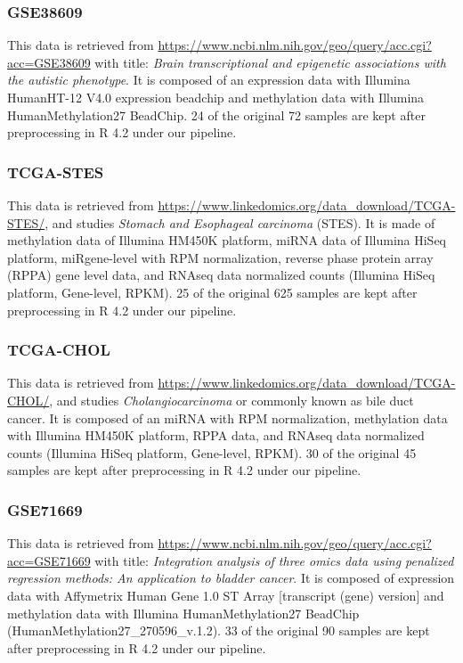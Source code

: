 \documentclass[
]{article}
\begin{document}
\hypertarget{gse38609}{%
\subsubsection{GSE38609}\label{gse38609}}

This data is retrieved from \url{https://www.ncbi.nlm.nih.gov/geo/query/acc.cgi?acc=GSE38609} with title: \emph{Brain transcriptional and epigenetic associations with the autistic phenotype}. It is composed of an expression data with Illumina HumanHT-12 V4.0 expression beadchip and methylation data with Illumina HumanMethylation27 BeadChip. 24 of the original 72 samples are kept after preprocessing in R 4.2 under our pipeline.

\hypertarget{tcga-stes}{%
\subsubsection{TCGA-STES}\label{tcga-stes}}

This data is retrieved from \url{https://www.linkedomics.org/data_download/TCGA-STES/}, and studies \emph{Stomach and Esophageal carcinoma} (STES). It is made of methylation data of Illumina HM450K platform, miRNA data of Illumina HiSeq platform, miRgene-level with RPM normalization, reverse phase protein array (RPPA) gene level data, and RNAseq data normalized counts (Illumina HiSeq platform, Gene-level, RPKM). 25 of the original 625 samples are kept after preprocessing in R 4.2 under our pipeline.

\hypertarget{tcga-chol}{%
\subsubsection{TCGA-CHOL}\label{tcga-chol}}

This data is retrieved from \url{https://www.linkedomics.org/data_download/TCGA-CHOL/}, and studies \emph{Cholangiocarcinoma} or commonly known as bile duct cancer. It is composed of an miRNA with RPM normalization, methylation data with Illumina HM450K platform, RPPA data, and RNAseq data normalized counts (Illumina HiSeq platform, Gene-level, RPKM). 30 of the original 45 samples are kept after preprocessing in R 4.2 under our pipeline.

\hypertarget{gse71669}{%
\subsubsection{GSE71669}\label{gse71669}}

This data is retrieved from \url{https://www.ncbi.nlm.nih.gov/geo/query/acc.cgi?acc=GSE71669} with title: \emph{Integration analysis of three omics data using penalized regression methods: An application to bladder cancer}. It is composed of expression data with Affymetrix Human Gene 1.0 ST Array {[}transcript (gene) version{]} and methylation data with Illumina HumanMethylation27 BeadChip (HumanMethylation27\_270596\_v.1.2). 33 of the original 90 samples are kept after preprocessing in R 4.2 under our pipeline.
\end{document}
